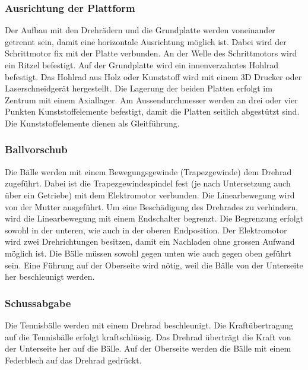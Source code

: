 \subsubsection{Ausrichtung der Plattform}
Der Aufbau mit den Drehrädern und die Grundplatte werden voneinander getrennt sein, damit eine horizontale Ausrichtung möglich ist. Dabei wird der Schrittmotor fix mit der Platte verbunden. An der Welle des Schrittmotors wird ein Ritzel befestigt. Auf der Grundplatte wird ein innenverzahntes Hohlrad befestigt. Das Hohlrad aus Holz oder Kunststoff wird mit einem 3D Drucker oder Laserschneidgerät hergestellt. Die Lagerung der beiden Platten erfolgt im Zentrum mit einem Axiallager. Am Aussendurchmesser werden an drei oder vier Punkten Kunststoffelemente befestigt, damit die Platten seitlich abgestützt sind. Die Kunststoffelemente dienen als Gleitführung.

\subsubsection{Ballvorschub}
Die Bälle werden mit einem Bewegungsgewinde (Trapezgewinde) dem Drehrad zugeführt. Dabei ist die Trapezgewindespindel fest (je nach Untersetzung auch über ein Getriebe) mit dem Elektromotor verbunden. Die Linearbewegung wird von der Mutter ausgeführt. Um eine Beschädigung des Drehrades zu verhindern, wird die Linearbewegung mit einem Endschalter begrenzt. Die Begrenzung erfolgt sowohl in der unteren, wie auch in der oberen Endposition. Der Elektromotor wird zwei Drehrichtungen besitzen, damit ein Nachladen ohne grossen Aufwand möglich ist. Die Bälle müssen sowohl gegen unten wie auch gegen oben geführt sein. Eine Führung auf der Oberseite wird nötig, weil die Bälle von der Unterseite her beschleunigt werden.

\subsubsection{Schussabgabe}
Die Tennisbälle werden mit einem Drehrad beschleunigt. Die Kraftübertragung auf die Tennisbälle erfolgt kraftschlüssig. Das Drehrad überträgt die Kraft von der Unterseite her auf die Bälle. Auf der Oberseite werden die Bälle mit einem Federblech auf das Drehrad gedrückt.